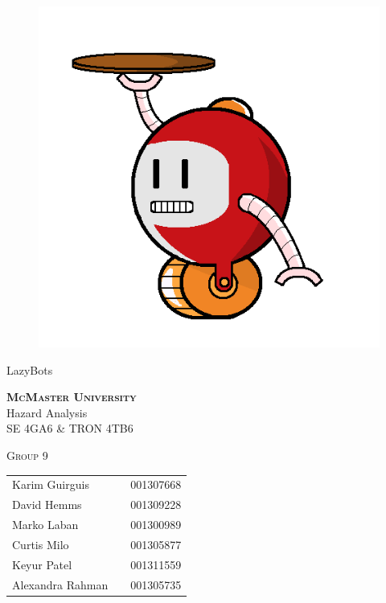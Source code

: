 \documentclass [10pt]{article}
\begin{document}
\begin {center} 

\thispagestyle{empty}
\vspace*{5cm}

\begin {figure}[h!]
\centering
\hspace{-10mm}\includegraphics [scale = .3, trim={.4cm 0 .8cm 0},clip] {figures/alfred.png}
\end {figure}

{\fontfamily{\cabinfamily}\selectfont
\Huge{LazyBots} }

\vspace{1 cm}
{\Large\textbf{\textsc{McMaster University}}\\}  \vspace {1cm}
{\Large Hazard Analysis\\ \vspace {0.4 cm} SE 4GA6 \& TRON 4TB6}  \vspace {1cm}

{\large \textsc{Group 9} \\} \vspace{1cm}



\begin{tabular}{ l c  l}
Karim Guirguis & & 001307668 \\
David Hemms & & 001309228 \\
Marko Laban & & 001300989 \\
Curtis Milo & & 001305877 \\
Keyur Patel & & 001311559 \\
Alexandra Rahman & & 001305735
\end{tabular}


\end{center}
\end{document}
